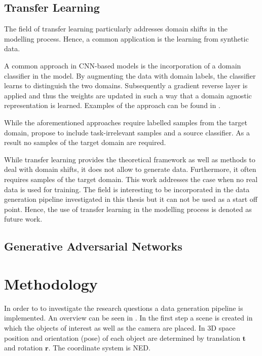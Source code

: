 \subsection{Transfer Learning}

The field of transfer learning particularly addresses domain shifts in the modelling process. Hence, a common application is the learning from synthetic data.

A common approach in \ac{CNN}-based models is the incorporation of a domain classifier in the model. By augmenting the data with domain labels, the classifier learns to distinguish the two domains. Subsequently a gradient reverse layer is applied and thus the weights are updated in such a way that a domain agnostic representation is learned. Examples of the approach can be found in \cite{Chen2018c} \cite{Xu2017}.

While the aforementioned approaches require labelled samples from the target domain, \citeauthor{Peng2017} \cite{Peng2017} propose to include task-irrelevant samples and a source classifier. As a result no samples of the target domain are required.

While transfer learning provides the theoretical framework as well as methods to deal with domain shifts, it does not allow to generate data. Furthermore, it often requires samples of the target domain. This work addresses the case when no real data is used for training. The field is interesting to be incorporated in the data generation pipeline investigated in this thesis but it can not be used as a start off point. Hence, the use of transfer learning in the modelling process is denoted as future work.

\subsection{Generative Adversarial Networks}

\cite{Inoue} 

\section{Methodology}

In order to to investigate the research questions a data generation pipeline is implemented. An overview can be seen in . In the first step a scene is created in which the objects of interest as well as the camera are placed. In 3D space position and orientation (pose) of each object are determined by translation $\textbf{t}$ and rotation $\textbf{r}$. The coordinate system is \ac{NED}.

